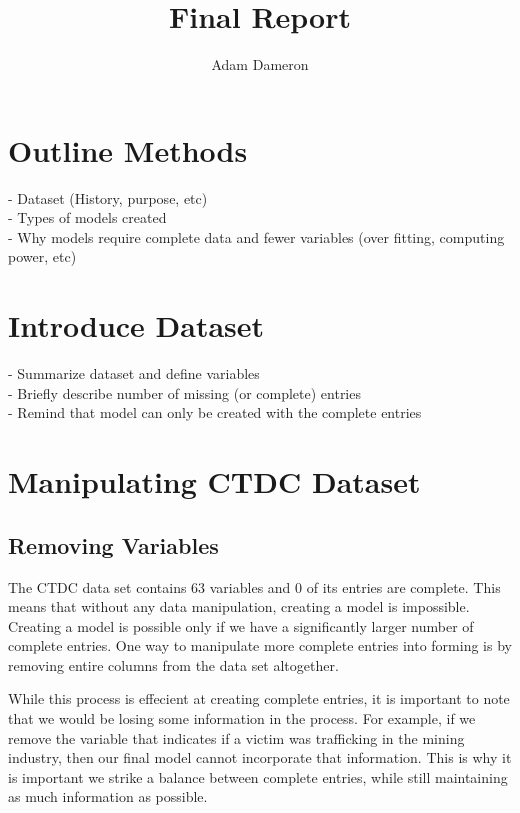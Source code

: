 \documentclass{article} %
\title{Final Report}
\author{
	Adam Dameron
}
\begin{document}
	
	
	\maketitle
	
	\begin{abstract}
		
	\end{abstract}
	
	\section{Outline Methods}
	
	- Dataset (History, purpose, etc)\\
	- Types of models created\\
		- Why models require complete data and fewer variables (over fitting, computing power, etc)
	
	
	\section{Introduce Dataset}
	
	- Summarize dataset and define variables\\
	- Briefly describe number of missing (or complete) entries\\
	- Remind that model can only be created with the complete entries\\
	
	
	\section*{Manipulating CTDC Dataset}
	

	
	\subsection{Removing Variables}
	
	The CTDC data set contains 63 variables and 0 of its entries are complete. This means that without any data manipulation, creating a model is impossible. Creating a model is possible only if we have a significantly larger number of complete entries. One way to manipulate more complete entries into forming is by removing entire columns from the data set altogether. 
	
	While this process is effecient at creating complete entries, it is important to note that we would be losing some information in the process. For example, if we remove the variable that indicates if a victim was trafficking in the mining industry, then our final model cannot incorporate that information. This is why it is important we strike a balance between complete entries, while still maintaining as much information as possible.
	
\end{document}
